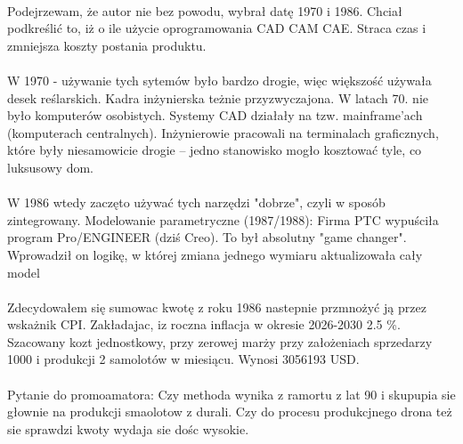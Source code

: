             \paragraph{}
                Podejrzewam, że autor \cite{galinski} nie bez powodu, wybrał datę 1970 i 1986.
                Chciał podkreślić to, iż o ile użycie oprogramowania CAD CAM CAE.
                Straca czas i zmniejsza koszty postania produktu.
            
            \paragraph{}
                W 1970 - używanie tych sytemów było bardzo drogie,
                więc większość używała desek reślarskich.
                Kadra inżynierska teżnie przyzwyczajona.
                W latach 70. nie było komputerów osobistych. 
                Systemy CAD działały na tzw. mainframe’ach (komputerach centralnych).
                Inżynierowie pracowali na terminalach graficznych, 
                które były niesamowicie drogie – jedno stanowisko mogło kosztować tyle, 
                co luksusowy dom.
            
            \paragraph{}
                W 1986 wtedy zaczęto używać tych narzędzi "dobrze",
                czyli w sposób zintegrowany.
                Modelowanie parametryczne (1987/1988):
                Firma PTC wypuściła program Pro/ENGINEER (dziś Creo).
                To był absolutny "game changer".
                Wprowadził on logikę,
                w której zmiana jednego wymiaru aktualizowała cały model

            \paragraph{}
                Zdecydowałem się sumowac kwotę z roku 1986 nastepnie przmnożyć ją przez wskażnik CPI.
                Zakładajac, iz roczna inflacja w okresie 2026-2030 2.5 \%. Szacowany kozt jednostkowy,
                przy zerowej marży przy założeniach sprzedarzy 1000 i produkcji 2 samolotów w miesiącu.
                Wynosi 3056193 USD.

            \paragraph{}
                Pytanie do promoamatora:
                \newline
                Czy methoda wynika z ramortu z lat 90 i skupupia sie głownie na produkcji smaolotow z durali.
                Czy do procesu produkcjnego drona też sie sprawdzi kwoty wydaja sie dośc wysokie.



    


